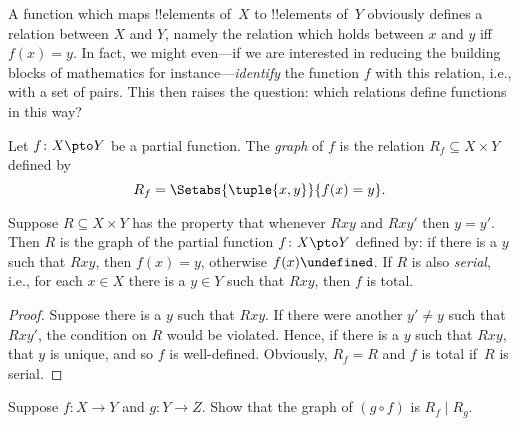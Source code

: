 \documentclass[../../../include/open-logic-section]{subfiles}
\begin{document}


\begin{explain}
A function which maps !!{element}s of~$X$ to !!{element}s of~$Y$
obviously defines a relation between $X$ and $Y$, namely the relation
which holds between $x$ and $y$ iff $f(x) = y$.  In fact, we might
even---if we are interested in reducing the building blocks of
mathematics for instance---\emph{identify} the function $f$ with this
relation, i.e., with a set of pairs.  This then raises the question:
which relations define functions in this way?
\end{explain}

\begin{defn}
Let $f\colon X \pto Y$ be a partial function. The \emph{graph} of $f$
is the relation $R_f \subseteq X \times Y$ defined by
\[
R_f = \Setabs{\tuple{x,y}}{f(x) = y}.
\]
\end{defn}

\begin{prop}
Suppose $R \subseteq X \times Y$ has the property that whenever $Rxy$
and $Rxy'$ then $y = y'$.  Then $R$ is the graph of the partial
function $f\colon X \pto Y$ defined by: if there is a $y$ such that
$Rxy$, then $f(x) = y$, otherwise $f(x) \undefined$.  If $R$ is also 
\emph{serial}, i.e., for each $x \in X$ there is a $y \in Y$ such that
$Rxy$, then $f$ is total.
\end{prop}

\begin{proof}
Suppose there is a $y$ such that $Rxy$.  If there were another $y'
\neq y$ such that $Rxy'$, the condition on $R$ would be
violated. Hence, if there is a $y$ such that $Rxy$, that $y$ is
unique, and so $f$ is well-defined.  Obviously, $R_f = R$ and $f$ is
total if~$R$ is serial.
\end{proof}

\begin{prob}
Suppose $f \colon X \to Y$ and $g \colon Y \to Z$. Show that the graph
of $(g \circ f)$ is $R_f \mid R_g$.
\end{prob}
\end{document}
